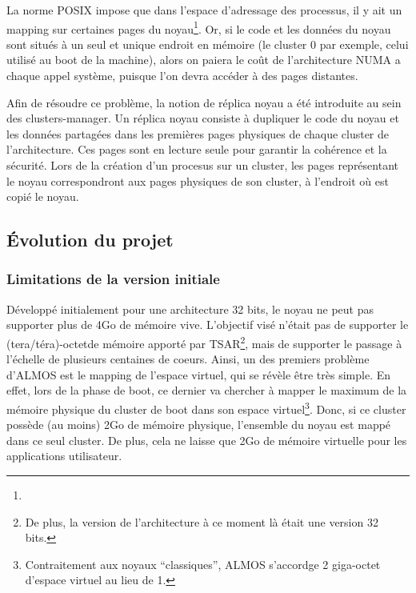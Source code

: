       La norme POSIX impose que dans l'espace d'adressage des processus, il y
      ait un mapping sur certaines pages du noyau\footnote{}. Or, si le code et les données du noyau
      sont situés à un seul et unique endroit en mémoire (le cluster 0 par
      exemple, celui utilisé au boot de la machine), alors on paiera le coût de
      l'architecture NUMA a chaque appel système, puisque l'on devra accéder à
      des pages distantes.

      Afin de résoudre ce problème, la notion de réplica noyau a été introduite
      au sein des clusters-manager. Un réplica noyau consiste à dupliquer le
      code du noyau et les données partagées dans les premières pages physiques
      de chaque cluster de l'architecture. Ces pages sont en lecture seule pour
      garantir la cohérence et la sécurité. Lors de la création d'un procesus
      sur un cluster, les pages représentant le noyau correspondront aux pages
      physiques de son cluster, à l'endroit où est copié le noyau.


  \subsection{Évolution du projet}

    \subsubsection{Limitations de la version initiale}
    \label{subsec:unsolved}
    
      Développé initialement pour une architecture 32 bits, le noyau ne peut pas
      supporter plus de 4Go de mémoire vive. L'objectif visé n'était pas de
      supporter le (tera/téra)-octetde mémoire apporté par TSAR\footnote{De
        plus, la version de l'architecture à ce moment là était une version 32
        bits.}, mais de supporter le passage à l'échelle de plusieurs centaines
      de coeurs. Ainsi, un des premiers problème d'ALMOS est le mapping de
      l'espace virtuel, qui se révèle être très simple. En effet, lors de la
      phase de boot, ce dernier va chercher à mapper le maximum de la mémoire
      physique du cluster de boot dans son espace virtuel\footnote{Contraitement
        aux noyaux ``classiques'', ALMOS s'accordge 2 giga-octet d'espace
        virtuel au lieu de 1.}. Donc, si ce cluster possède (au moins) 2Go de
      mémoire physique, l'ensemble du noyau est mappé dans ce seul cluster. De
      plus, cela ne laisse que 2Go de mémoire virtuelle pour les applications
      utilisateur.

